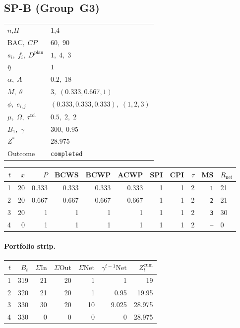 \documentclass[12pt, a4paper]{article}
\newcommand{\BAC}{\mathrm{BAC}}
\begin{document}
\newpage

\subsection*{SP-B  (Group~G3)}
\begin{center}
\begin{tabular}{ll}
\toprule
$n$,\;$H$ & $1$,\;$4$ \\
$\BAC,\;CP$ & $60,\;90$ \\
$s_i,\;f_i,\;D^{\mathrm{plan}}$ & $1,\;4,\;3$ \\
$\bar\eta$ & $1$ \\
$\alpha,\;A$ & $0.2,\;18$ \\
$M,\;\theta$ & $3,\;(0.333,0.667,1)$ \\
$\phi,\;e_{i,j}$ & $(0.333,0.333,0.333),\;(1,2,3)$ \\
$\mu,\;\Omega,\;\tau^{\mathrm{tol}}$ & $0.5,\;2,\;2$ \\
$B_1,\;\gamma$ & $300,\;0.95$ \\
$Z^*$ & $28.975$ \\
Outcome & \texttt{completed} \\
\bottomrule
\end{tabular}
\end{center}

\begin{center}
\begin{tabular}{rrrrrrrrrrl}
\toprule
$t$ & $x$ & $P$ & BCWS & BCWP & ACWP & SPI & CPI & $\tau$ & MS & $R_{\mathrm{net}}$\\
\midrule
1 & 20 & 0.333 & 0.333 & 0.333 & 0.333 & 1 & 1 & 2 & \texttt{1} & 21 \\
2 & 20 & 0.667 & 0.667 & 0.667 & 0.667 & 1 & 1 & 2 & \texttt{2} & 21 \\
3 & 20 & 1 & 1 & 1 & 1 & 1 & 1 & 2 & \texttt{3} & 30 \\
4 & 0 & 1 & 1 & 1 & 1 & 1 & 1 & 2 & \texttt{---} & 0 \\
\bottomrule
\end{tabular}
\end{center}
\paragraph{Portfolio strip.}
\begin{center}
\begin{tabular}{rrrrrrr}
\toprule
$t$ & $B_t$ & $\Sigma\mathrm{In}$ & $\Sigma\mathrm{Out}$ & $\Sigma\mathrm{Net}$ & $\gamma^{t-1}\mathrm{Net}$ & $Z_t^{\mathrm{cum}}$\\
\midrule
1 & 319 & 21 & 20 & 1 & 1 & 19 \\
2 & 320 & 21 & 20 & 1 & 0.95 & 19.95 \\
3 & 330 & 30 & 20 & 10 & 9.025 & 28.975 \\
4 & 330 & 0 & 0 & 0 & 0 & 28.975 \\
\bottomrule
\end{tabular}
\end{center}
\end{document}
